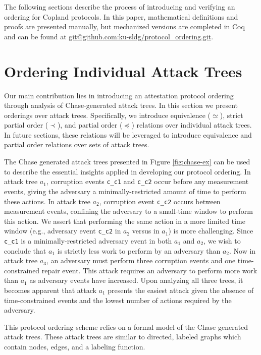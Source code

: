 \documentclass[runningheads]{llncs}
\theoremstyle{definition}
\begin{document}
The following sections describe the process of introducing and
verifying an ordering for Copland protocols. In this paper,
mathematical definitions and proofs are presented manually, but
mechanized versions are completed in Coq and can be found at
\url{git@github.com:ku-sldg/protocol_ordering.git}. 


\section{Ordering Individual Attack Trees}

Our main contribution lies in introducing an attestation protocol
ordering through analysis of Chase-generated attack trees. In this
section we present orderings over attack trees. Specifically, we
introduce equivalence ($\simeq$), strict partial order ($\prec$), and
partial order ($\preceq$) relations over individual attack trees. In
future sections, these relations will be leveraged to introduce
equivalence and partial order relations over sets of attack trees.

The Chase generated attack trees presented in Figure
\ref{fig:chase-ex} can be used to describe the essential insights
applied in developing our protocol ordering. In attack tree $a_1$,
corruption events \texttt{c\_c1} and \texttt{c\_c2} occur before any
measurement events, giving the adversary a minimally-restricted amount
of time to perform these actions. In attack tree $a_2$, corruption
event \texttt{c\_c2} occurs between measurement events, confining the
adversary to a small-time window to perform this action. We assert
that performing the same action in a more limited time window (e.g.,
adversary event \texttt{c\_c2} in $a_2$ versus in $a_1$) is more
challenging. Since \texttt{c\_c1} is a minimally-restricted adversary
event in both $a_1$ and $a_2$, we wish to conclude that $a_1$ is
strictly less work to perform by an adversary than $a_2$. Now in
attack tree $a_3$, an adversary must perform three corruption events
and one time-constrained repair event. This attack requires an
adversary to perform more work than $a_1$ as adversary events have
increased. Upon analyzing all three trees, it becomes apparent that
attack $a_1$ presents the easiest attack given the absence of
time-constrained events and the lowest number of actions required by
the adversary.  

This protocol ordering scheme relies on a formal model of the Chase
generated attack trees. These attack trees are similar to directed,
labeled graphs which contain nodes, edges, and a labeling function.  
\end{document}
